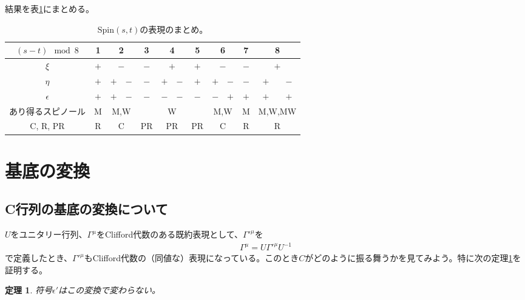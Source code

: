 \documentclass[12pt,a4paper]{jlreq}
\newtheorem{theo}{定理}
\begin{document}
結果を表\ref{SpinDrepGen}にまとめる。
\begin{table}[htb]
  \begin{center}
    \begin{tabular}{|c|c|c|c|c|c|c|c|c|c|c|c|c|}\hline
      $(s-t) \mod 8$ & 1 & \multicolumn{2}{|c|}{2} & 3 & \multicolumn{2}{|c|}{4} & 5 & \multicolumn{2}{|c|}{6} & 7 & \multicolumn{2}{|c|}{8} \\ \hline
      $\xi$ & $+$ & \multicolumn{2}{|c|}{$-$} & $-$ & \multicolumn{2}{|c|}{$+$} & $+$ & \multicolumn{2}{|c|}{$-$} & $-$ & \multicolumn{2}{|c|}{$+$} \\\hline
      $\eta$ & $+$ & $+$ & $-$ &  $-$ & $+$ & $-$ & $+$ & $+$ & $-$ & $-$ & $+$ & $-$ \\ \hline
      $\epsilon$ & $+$ & $+$ & $-$ & $-$ & $-$ & $-$ & $-$ & $-$ & $+$ & $+$ & $+$ & $+$ \\ \hline
      あり得るスピノール & M & \multicolumn{2}{|c|}{M,W} &  & \multicolumn{2}{|c|}{W} &  & \multicolumn{2}{|c|}{M,W} & M & \multicolumn{2}{|c|}{M,W,MW} \\ \hline
      C, R, PR & R & \multicolumn{2}{|c|}{C} & PR & \multicolumn{2}{|c|}{PR} & PR & \multicolumn{2}{|c|}{C} & R & \multicolumn{2}{|c|}{R} \\ \hline
    \end{tabular}
  \end{center} 
  \caption{Spin$(s,t)$の表現のまとめ。}
  \label{SpinDrepGen}
\end{table}



\appendix
\section{基底の変換}
\label{app:C}
\subsection{C行列の基底の変換について}
$U$をユニタリー行列、$\Gamma^{\mu}$をClifford代数のある既約表現として、$\Gamma'^{\mu}$を
\begin{align}
  \Gamma^{\mu}=U\Gamma'^{\mu}U^{-1}
  \label{transform}
\end{align}
で定義したとき、$\Gamma'^{\mu}$もClifford代数の（同値な）表現になっている。このとき$C$がどのように振る舞うかを見てみよう。特に次の定理\ref{th:epsilon}を証明する。
\begin{theo}\label{th:epsilon}
  符号$\epsilon'$はこの変換で変わらない。
\end{theo}
\end{document}
